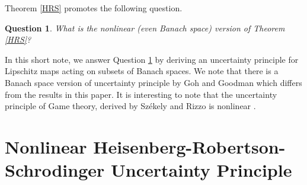 \documentclass{amsart}
\newtheorem{question}[theorem]{Question}
\begin{document}
Theorem \ref{HRS} promotes the following question.
\begin{question}\label{Q}
	What is the nonlinear (even Banach space) version of Theorem \ref{HRS}?
\end{question}
  In this short note,  we answer Question \ref{Q} by deriving an uncertainty principle for Lipschitz maps acting on subsets of Banach spaces.  We note that there is a Banach space version of uncertainty principle by Goh and Goodman \cite{GOHGOODMAN}  which differs from the results in this paper. It is interesting to note that the uncertainty principle of Game theory, derived by Sz\'{e}kely and Rizzo is nonlinear \cite{SZEKELYRIZZO}.





\section{Nonlinear Heisenberg-Robertson-Schrodinger Uncertainty Principle}
\end{document}
